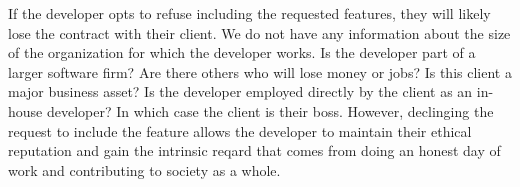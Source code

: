 If the developer opts to refuse including the requested features, they will likely lose the contract with their client. We do not have any information about the size of the organization for which the developer works. Is the developer part of a larger software firm? Are there others who will lose money or jobs? Is this client a major business asset? Is the developer employed directly by the client as an in-house developer? In which case the client is their boss. However, declinging the request to include the feature allows the developer to maintain their ethical reputation and gain the intrinsic reqard that comes from doing an honest day of work and contributing to society as a whole.
